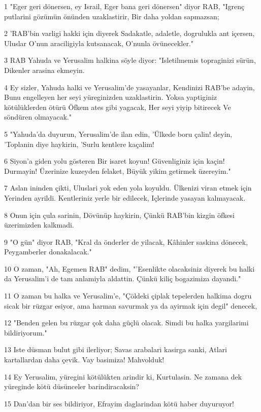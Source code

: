 \par 1 "Eger geri dönersen, ey Israil, Eger bana geri dönersen" diyor RAB, "Igrenç putlarini gözümün önünden uzaklastirir, Bir daha yoldan sapmazsan;
\par 2 'RAB'bin varligi hakki için diyerek Sadakatle, adaletle, dogrulukla ant içersen, Uluslar O'nun araciligiyla kutsanacak, O'nunla övünecekler."
\par 3 RAB Yahuda ve Yerusalim halkina söyle diyor: "Isletilmemis topraginizi sürün, Dikenler arasina ekmeyin.
\par 4 Ey sizler, Yahuda halki ve Yerusalim'de yasayanlar, Kendinizi RAB'be adayin, Bunu engelleyen her seyi yüreginizden uzaklastirin. Yoksa yaptiginiz kötülüklerden ötürü Öfkem ates gibi yagacak, Her seyi yiyip bitirecek Ve söndüren olmayacak."
\par 5 "Yahuda'da duyurun, Yerusalim'de ilan edin, 'Ülkede boru çalin! deyin, 'Toplanin diye haykirin, 'Surlu kentlere kaçalim!
\par 6 Siyon'a giden yolu gösteren Bir isaret koyun! Güvenliginiz için kaçin! Durmayin! Üzerinize kuzeyden felaket, Büyük yikim getirmek üzereyim."
\par 7 Aslan ininden çikti, Uluslari yok eden yola koyuldu. Ülkenizi viran etmek için Yerinden ayrildi. Kentleriniz yerle bir edilecek, Içlerinde yasayan kalmayacak.
\par 8 Onun için çula sarinin, Dövünüp haykirin, Çünkü RAB'bin kizgin öfkesi üzerimizden kalkmadi.
\par 9 "O gün" diyor RAB, "Kral da önderler de yilacak, Kâhinler saskina dönecek, Peygamberler donakalacak."
\par 10 O zaman, "Ah, Egemen RAB" dedim, "'Esenlikte olacaksiniz diyerek bu halki da Yerusalim'i de tam anlamiyla aldattin. Çünkü kiliç bogazimiza dayandi."
\par 11 O zaman bu halka ve Yerusalim'e, "Çöldeki çiplak tepelerden halkima dogru sicak bir rüzgar esiyor, ama harman savurmak ya da ayirmak için degil" denecek,
\par 12 "Benden gelen bu rüzgar çok daha güçlü olacak. Simdi bu halka yargilarimi bildiriyorum."
\par 13 Iste düsman bulut gibi ilerliyor; Savas arabalari kasirga sanki, Atlari kartallardan daha çevik. Vay basimiza! Mahvolduk!
\par 14 Ey Yerusalim, yüregini kötülükten arindir ki, Kurtulasin. Ne zamana dek yüreginde kötü düsünceler barindiracaksin?
\par 15 Dan'dan bir ses bildiriyor, Efrayim daglarindan kötü haber duyuruyor!
